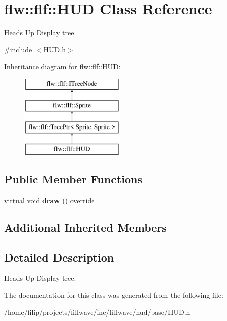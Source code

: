 \hypertarget{classflw_1_1flf_1_1HUD}{}\section{flw\+:\+:flf\+:\+:H\+UD Class Reference}
\label{classflw_1_1flf_1_1HUD}


Heads Up Display tree.  




{\ttfamily \#include $<$H\+U\+D.\+h$>$}

Inheritance diagram for flw\+:\+:flf\+:\+:H\+UD\+:\begin{figure}[H]
\begin{center}
\leavevmode
\includegraphics[height=4.000000cm]{classflw_1_1flf_1_1HUD}
\end{center}
\end{figure}
\subsection*{Public Member Functions}
\begin{DoxyCompactItemize}
\item 
\mbox{\label{classflw_1_1flf_1_1HUD_a3392d188f610fe9eba0c701236da0569}} 
virtual void {\bfseries draw} () override
\end{DoxyCompactItemize}
\subsection*{Additional Inherited Members}


\subsection{Detailed Description}
Heads Up Display tree. 

The documentation for this class was generated from the following file\+:\begin{DoxyCompactItemize}
\item 
/home/filip/projects/fillwave/inc/fillwave/hud/base/H\+U\+D.\+h\end{DoxyCompactItemize}

